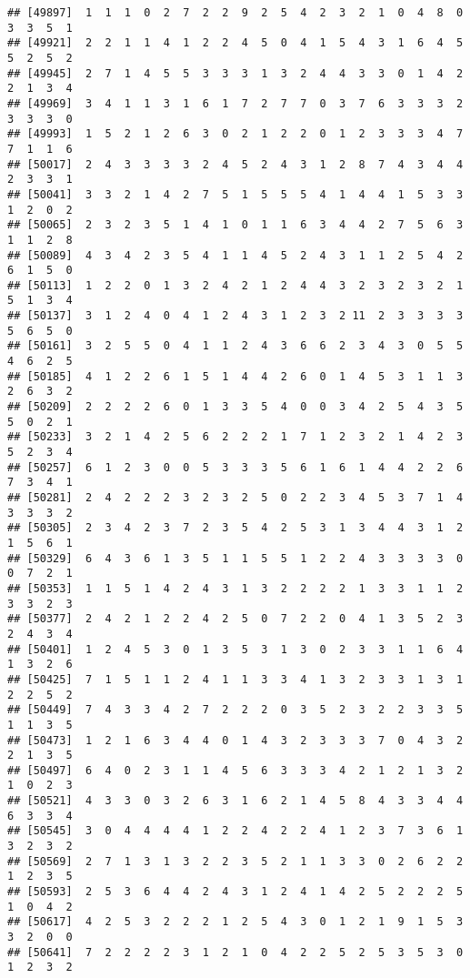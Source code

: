 \documentclass[
]{article}
\begin{document}
\begin{verbatim}
## [49897]  1  1  1  0  2  7  2  2  9  2  5  4  2  3  2  1  0  4  8  0  3  3  5  1
## [49921]  2  2  1  1  4  1  2  2  4  5  0  4  1  5  4  3  1  6  4  5  5  2  5  2
## [49945]  2  7  1  4  5  5  3  3  3  1  3  2  4  4  3  3  0  1  4  2  2  1  3  4
## [49969]  3  4  1  1  3  1  6  1  7  2  7  7  0  3  7  6  3  3  3  2  3  3  3  0
## [49993]  1  5  2  1  2  6  3  0  2  1  2  2  0  1  2  3  3  3  4  7  7  1  1  6
## [50017]  2  4  3  3  3  3  2  4  5  2  4  3  1  2  8  7  4  3  4  4  2  3  3  1
## [50041]  3  3  2  1  4  2  7  5  1  5  5  5  4  1  4  4  1  5  3  3  1  2  0  2
## [50065]  2  3  2  3  5  1  4  1  0  1  1  6  3  4  4  2  7  5  6  3  1  1  2  8
## [50089]  4  3  4  2  3  5  4  1  1  4  5  2  4  3  1  1  2  5  4  2  6  1  5  0
## [50113]  1  2  2  0  1  3  2  4  2  1  2  4  4  3  2  3  2  3  2  1  5  1  3  4
## [50137]  3  1  2  4  0  4  1  2  4  3  1  2  3  2 11  2  3  3  3  3  5  6  5  0
## [50161]  3  2  5  5  0  4  1  1  2  4  3  6  6  2  3  4  3  0  5  5  4  6  2  5
## [50185]  4  1  2  2  6  1  5  1  4  4  2  6  0  1  4  5  3  1  1  3  2  6  3  2
## [50209]  2  2  2  2  6  0  1  3  3  5  4  0  0  3  4  2  5  4  3  5  5  0  2  1
## [50233]  3  2  1  4  2  5  6  2  2  2  1  7  1  2  3  2  1  4  2  3  5  2  3  4
## [50257]  6  1  2  3  0  0  5  3  3  3  5  6  1  6  1  4  4  2  2  6  7  3  4  1
## [50281]  2  4  2  2  2  3  2  3  2  5  0  2  2  3  4  5  3  7  1  4  3  3  3  2
## [50305]  2  3  4  2  3  7  2  3  5  4  2  5  3  1  3  4  4  3  1  2  1  5  6  1
## [50329]  6  4  3  6  1  3  5  1  1  5  5  1  2  2  4  3  3  3  3  0  0  7  2  1
## [50353]  1  1  5  1  4  2  4  3  1  3  2  2  2  2  1  3  3  1  1  2  3  3  2  3
## [50377]  2  4  2  1  2  2  4  2  5  0  7  2  2  0  4  1  3  5  2  3  2  4  3  4
## [50401]  1  2  4  5  3  0  1  3  5  3  1  3  0  2  3  3  1  1  6  4  1  3  2  6
## [50425]  7  1  5  1  1  2  4  1  1  3  3  4  1  3  2  3  3  1  3  1  2  2  5  2
## [50449]  7  4  3  3  4  2  7  2  2  2  0  3  5  2  3  2  2  3  3  5  1  1  3  5
## [50473]  1  2  1  6  3  4  4  0  1  4  3  2  3  3  3  7  0  4  3  2  2  1  3  5
## [50497]  6  4  0  2  3  1  1  4  5  6  3  3  3  4  2  1  2  1  3  2  1  0  2  3
## [50521]  4  3  3  0  3  2  6  3  1  6  2  1  4  5  8  4  3  3  4  4  6  3  3  4
## [50545]  3  0  4  4  4  4  1  2  2  4  2  2  4  1  2  3  7  3  6  1  3  2  3  2
## [50569]  2  7  1  3  1  3  2  2  3  5  2  1  1  3  3  0  2  6  2  2  1  2  3  5
## [50593]  2  5  3  6  4  4  2  4  3  1  2  4  1  4  2  5  2  2  2  5  1  0  4  2
## [50617]  4  2  5  3  2  2  2  1  2  5  4  3  0  1  2  1  9  1  5  3  3  2  0  0
## [50641]  7  2  2  2  2  3  1  2  1  0  4  2  2  5  2  5  3  5  3  0  1  2  3  2

\end{verbatim}
\end{document}
